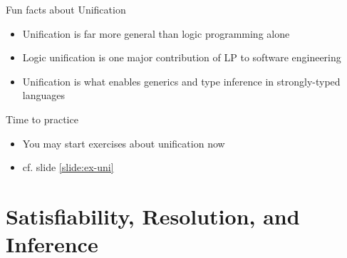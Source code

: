 \documentclass[presentation]{beamer}\mode<presentation>{\usetheme{AMSBolognaFC}}
\begin{document}
\begin{frame}{Fun facts about Unification}
    \begin{itemize}
        \item Unification is far more general than logic programming alone
        
        \vfill

        \item Logic unification is one major contribution of LP to \alert{software engineering}
        
        \vfill

        \item Unification is what enables \alert{generics} and \alert{type inference} in strongly-typed languages
    \end{itemize}
\end{frame}

\begin{frame}
    \begin{block}{Time to practice}
        \begin{itemize}
            \item You may start exercises about \alert{unification} now
            \item cf. slide \ref{slide:ex-uni}
        \end{itemize}
    \end{block}
\end{frame}

\section{Satisfiability, Resolution, and Inference}
\end{document}
